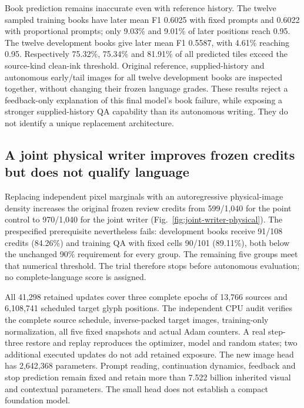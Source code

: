\documentclass[12pt,a4paper]{article}
\providecommand{\DIFadd}[1]{{\protect\color{blue} \sf #1}} %
\begin{document}
\DIFadd{Book prediction remains inaccurate even with reference history. The twelve
sampled training books have later mean F1 0.6025 with fixed prompts and 0.6022
with proportional prompts; only 9.03\% and 9.01\% of later positions reach
0.95. The twelve development books give later mean F1 0.5587, with 4.61\%
reaching 0.95. Respectively 75.32\%, 75.34\% and 81.91\% of all predicted
tiles exceed the source-kind clean-ink threshold. Original reference,
supplied-history and autonomous early/tail images for all twelve development
books are inspected together, without changing their frozen language grades.
These results reject a feedback-only explanation of this final model's book
failure, while exposing a stronger supplied-history QA capability than its
autonomous writing. They do not identify a unique replacement architecture.
}

\subsection*{\DIFadd{A joint physical writer improves frozen credits but does not qualify language}}

\DIFadd{Replacing independent pixel marginals with an autoregressive physical-image
density increases the original frozen review credits from 599/1,040 for the
point control to 970/1,040 for the joint writer (Fig.~\ref{fig:joint-writer-physical}).
The prespecified prerequisite nevertheless fails: development books receive
91/108 credits (84.26\%) and training QA with fixed cells 90/101 (89.11\%), both
below the unchanged 90\% requirement for every group. The remaining five groups
meet that numerical threshold. The trial therefore stops before autonomous
evaluation; no complete-language score is assigned.
}

\DIFadd{All 41,298 retained updates cover three complete epochs of 13,766 sources and
6,108,741 scheduled target glyph positions. The independent CPU audit verifies
the complete source schedule, inverse-packed target images, training-only
normalization, all five fixed snapshots and actual Adam counters. A real
step-three restore and replay reproduces the optimizer, model and random states;
two additional executed updates do not add retained exposure. The new image
head has 2,642,368 parameters. Prompt reading, continuation dynamics, feedback
and stop prediction remain fixed and retain more than 7.522 billion inherited
visual and contextual parameters. The small head does not establish a compact
foundation model.
}
\end{document}
